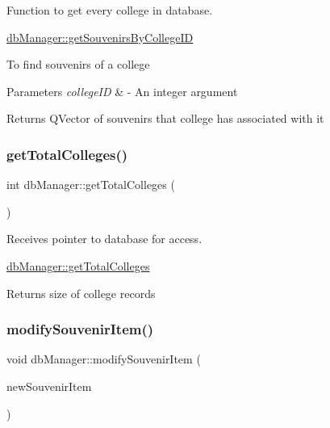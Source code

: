 Function to get every college in database. 

\mbox{\hyperlink{classdb_manager_a91281dfbeb41cebfa8a633e3a7e12a5e}{db\+Manager\+::get\+Souvenirs\+By\+College\+ID}}

To find souvenirs of a college 
\begin{DoxyParams}{Parameters}
{\em college\+ID} & -\/ An integer argument \\
\hline
\end{DoxyParams}
\begin{DoxyReturn}{Returns}
Q\+Vector of souvenirs that college has associated with it 
\end{DoxyReturn}
\mbox{\label{classdb_manager_ae211811d8431bd57bd250c2ab753f691}} 
\subsubsection{\texorpdfstring{get\+Total\+Colleges()}{getTotalColleges()}}
{\footnotesize\ttfamily int db\+Manager\+::get\+Total\+Colleges (\begin{DoxyParamCaption}{ }\end{DoxyParamCaption})}



Receives pointer to database for access. 

\mbox{\hyperlink{classdb_manager_ae211811d8431bd57bd250c2ab753f691}{db\+Manager\+::get\+Total\+Colleges}}

\begin{DoxyReturn}{Returns}
size of college records 
\end{DoxyReturn}
\mbox{\label{classdb_manager_a4d1f437fbf2bed7786324a8dcf639a4a}} 
\subsubsection{\texorpdfstring{modify\+Souvenir\+Item()}{modifySouvenirItem()}}
{\footnotesize\ttfamily void db\+Manager\+::modify\+Souvenir\+Item (\begin{DoxyParamCaption}\item[{\mbox{\hyperlink{structsouvenir_item}{souvenir\+Item}}}]{new\+Souvenir\+Item }\end{DoxyParamCaption})}



